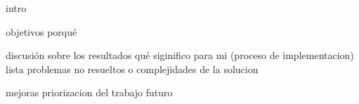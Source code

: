 	

intro

	objetivos
	porqué

discusión sobre los resultados
qué siginifico para mi (proceso de implementacion)
lista problemas no resueltos o complejidades de la solucion


mejoras	
priorizacion del trabajo futuro

